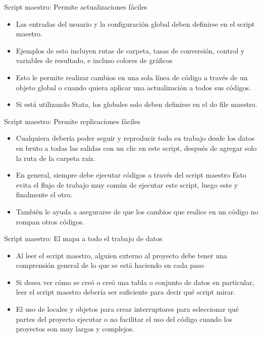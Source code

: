 \documentclass[11pt, aspectratio=169, compress]{beamer}
\begin{document}
\begin{frame}{Script maestro: Permite actualizaciones fáciles}
	\begin{itemize}
		\item Las entradas del usuario y la configuración global deben definirse en el script maestro.
		\item Ejemplos de esto incluyen rutas de carpeta, tasas de conversión, control y variables de resultado, e incluso colores de gráficos
		\item Esto le permite realizar cambios en una sola línea de código a través de un objeto global o cuando quiera aplicar una actualización a todos sus códigos.
		\item Si está utilizando Stata, los globales solo deben definirse en el do file maestro.
	\end{itemize}
\end{frame}
\begin{frame}{Script maestro: Permite replicaciones fáciles}
	\begin{itemize}
		\item Cualquiera debería poder seguir y reproducir todo su trabajo desde los datos en bruto a todas las salidas con un clic en este script, después de agregar solo la ruta de la carpeta raíz.
		\item En general, siempre debe ejecutar códigos a través del script maestro Esto evita el flujo de trabajo muy común de ejecutar este script, luego este y finalmente el otro.
		\item También le ayuda a asegurarse de que los cambios que realice en un código no rompan otros códigos.
	\end{itemize}
\end{frame}
\begin{frame}{Script maestro: El mapa a todo el trabajo de datos}
	\begin{itemize}
		\item Al leer el script maestro, alguien externo al proyecto debe tener una comprensión general de lo que se está haciendo en cada paso

		\item Si desea ver cómo se creó o creó una tabla o conjunto de datos en particular, leer el script maestro debería ser suficiente para decir qué script mirar.
		
		\item El uso de locales y objetos para crear interruptores para seleccionar qué partes del proyecto ejecutar o no facilitar el uso del código cuando los proyectos son muy largos y complejos.
	\end{itemize}
\end{frame}
\end{document}
